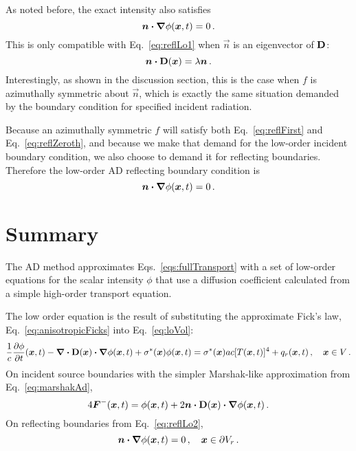 As noted before, the exact intensity also satisfies
\begin{equation}\label{eq:reflZeroth}
  \bm{n}\bm{\cdot}\bm{\nabla} \phi(\bm{x}, t) = 0 \,.
\end{equation}
This is only compatible with Eq.~\eqref{eq:reflLo1} when $\vec{n}$ is an
eigenvector of $\mathbf{D}$:
\begin{equation*}
  \bm{n} \bm{\cdot} \mathbf{D}(\bm{x}) = \lambda \bm{n}\,.
\end{equation*}
Interestingly, as shown in the discussion section, this is the case when $f$ is
azimuthally symmetric about
$\vec{n}$, which is exactly the same situation demanded by the boundary
condition for specified incident radiation.

Because an azimuthally symmetric $f$ will satisfy both Eq.~\eqref{eq:reflFirst}
and Eq.~\eqref{eq:reflZeroth}, and because we make that demand for the low-order
incident boundary condition, we also choose to demand it for reflecting
boundaries. Therefore the low-order AD reflecting boundary condition is
\begin{equation}\label{eq:reflLo2}
  \bm{n} \bm{\cdot} \bm{\nabla} \phi(\bm{x}, t) = 0\,.
\end{equation}


\section{Summary}
The AD method approximates Eqs.~\eqref{eqs:fullTransport} with a set of
low-order equations for the scalar intensity $\phi$ that use a diffusion
coefficient calculated from a simple high-order transport equation.

The low order equation is the result of substituting the approximate Fick's law,
Eq.~\eqref{eq:anisotropicFicks} into Eq.~\eqref{eq:loVol}:
\begin{equation*}
\frac{1}{c} \frac{\partial \phi}{\partial t} (\bm{x}, t)
  - \bm{\nabla} \bm{\cdot} \mathbf{D}(\bm{x}) \bm{\cdot} \bm{\nabla} \phi(\bm{x},t)
  + \sigma^\ast(\bm{x}) \phi(\bm{x}, t)
  = \sigma^\ast(\bm{x}) ac [T(\bm{x}, t)]^4 + q_{r}(\bm{x}, t) \,,
  \quad \bm{x} \in V \,.
\end{equation*}
On incident source boundaries with the simpler Marshak-like approximation from
Eq.~\eqref{eq:marshakAd},
\begin{equation*}
  4 \bm{F}^-(\bm{x}, t)
  = \phi(\bm{x}, t)
  + 2 \bm{n} \bm{\cdot} \mathbf{D}(\bm{x}) \bm{\cdot} \bm{\nabla} \phi(\bm{x}, t) \,.
\end{equation*}
On reflecting boundaries from Eq.~\eqref{eq:reflLo2},
\begin{equation*}
  \bm{n}\bm{\cdot}\bm{\nabla} \phi(\bm{x}, t) = 0 \,,
  \quad \bm{x} \in \partial V_r \,.
\end{equation*}


